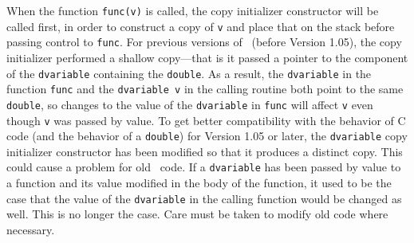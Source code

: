 \documentclass{admbmanual}
\begin{document}
When  the function \texttt{func(v)} is called, the copy initializer constructor
will be called first, in order to construct a copy of \texttt{v} and place that on 
the stack before passing control to
\texttt{func}. For previous versions of \scAD\ (before Version 1.05),
the copy initializer performed a 
shallow copy---that is it
passed a pointer to the component of the \texttt{dvariable} containing the 
\texttt{double}. As a result, the \texttt{dvariable} in the function \texttt{func}
and the \texttt{dvariable v} in the calling routine both point to the same
\texttt{double}, so changes to the value of the \texttt{dvariable}
in \texttt{func} will affect \texttt{v} even though \texttt{v} was passed by value.
To get better compatibility with the behavior of C code (and the behavior
of a \texttt{double}) for Version 1.05 or later, the \texttt{dvariable} copy initializer constructor has
been modified so that it produces a distinct copy. This could cause
a problem for old \scAD\ code. If a \texttt{dvariable} has been passed by
value to a function and its value modified in the body of the function,
it used to be the case that the value of the \texttt{dvariable} in the
calling function would be changed as well. This is no longer the case.
Care must be taken to modify old code where necessary. 

% 
% 
\end{document}
